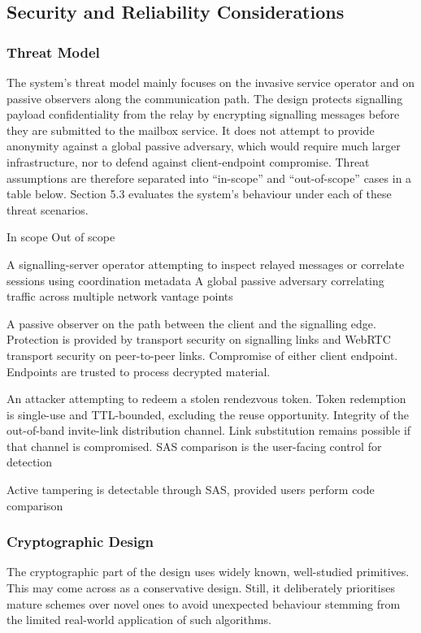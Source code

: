 \documentclass[12pt,a4paper]{article}
\begin{document}
\subsection{Security and Reliability Considerations}

\subsubsection{Threat Model}

The system’s threat model mainly focuses on the invasive service operator and on passive observers along the communication path. The design protects signalling payload confidentiality from the relay by encrypting signalling messages before they are submitted to the mailbox service. It does not attempt to provide anonymity against a global passive adversary, which would require much larger infrastructure, nor to defend against client-endpoint compromise. Threat assumptions are therefore separated into “in-scope” and “out-of-scope” cases in a table below. Section 5.3 evaluates the system’s behaviour under each of these threat scenarios.

In scope Out of scope

A signalling-server operator attempting to inspect relayed messages or correlate sessions using coordination metadata A global passive adversary correlating traffic across multiple network vantage points

A passive observer on the path between the client and the signalling edge. Protection is provided by transport security on signalling links and WebRTC transport security on peer-to-peer links. Compromise of either client endpoint. Endpoints are trusted to process decrypted material.

An attacker attempting to redeem a stolen rendezvous token. Token redemption is single-use and TTL-bounded, excluding the reuse opportunity. Integrity of the out-of-band invite-link distribution channel. Link substitution remains possible if that channel is compromised. SAS comparison is the user-facing control for detection

Active tampering is detectable through SAS, provided users perform code comparison

\subsubsection{Cryptographic Design}

The cryptographic part of the design uses widely known, well-studied primitives. This may come across as a conservative design. Still, it deliberately prioritises mature schemes over novel ones to avoid unexpected behaviour stemming from the limited real-world application of such algorithms.
\end{document}
